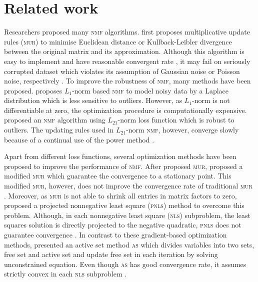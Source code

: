 \section{Related work}
Researchers proposed many \textsc{nmf} algorithms. \citet{lee2001algorithms} first proposes multiplicative update rules (\textsc{mur}) to minimise Euclidean distance or Kullback-Leibler divergence between the original matrix and its approximation. Although this algorithm is easy to implement and have reasonable convergent rate \citep{lee2001algorithms}, it may fail on seriously corrupted dataset which violates its assumption of Gaussian noise or Poisson noise, respectively \citep{guan2017truncated}.  To improve the robustness of \textsc{nmf}, many methods have been proposed. \citet{lam2008non} proposes ${L_1}$-norm based \textsc{nmf} to model noisy data by a Laplace distribution which is less sensitive to outliers. However, as $L_1$-norm is not differentiable at zero, the optimization procedure is computationally expensive. \citet{kong2011robust} proposed an \textsc{nmf} algorithm using $L_{21}$-norm loss function which is robust to outliers. The updating rules used in $L_{21}$-norm \textsc{nmf}, however, converge slowly because of a continual use of the power method \citep{guan2017truncated}.

Apart from different loss functions, several optimization methods have been proposed to improve the performance of \textsc{nmf}. After \citet{lee2001algorithms} proposed \textsc{mur}, \citet{ lin2007convergence} proposed a modified \textsc{mur} which guarantee the convergence to a stationary point. This modified \textsc{mur}, however, does not improve the convergence rate of traditional \textsc{mur} \citet{guan2012nenmf}. Moreover, as \textsc{mur} is not able to shrink all entries in matrix factors to zero, \citet{berry2007algorithms} proposed a projected nonnegative least square (\textsc{pnls}) method to overcome this problem. Although, in each nonnegative least square (\textsc{nls}) subproblem, the least squares solution is directly projected to the negative quadratic, \textsc{pnls} does not guarantee convergence \citet{guan2012nenmf}. In contrast to these gradient-based optimization methods, \citet{kim2008nonnegative} presented an active set method \textsc{as} which divides variables into two sets, free set and active set and update free set in each iteration by solving unconstrained equation. Even though \textsc{as} has good convergence rate, it assumes strictly convex in each \textsc{nls} subproblem \citet{kim2008nonnegative}.
